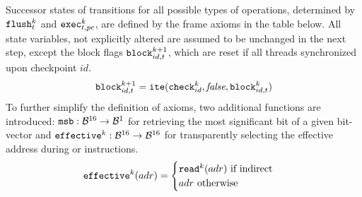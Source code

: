 \noindent
Successor states of transitions for all possible types of operations, determined by $\FLUSH^k_t$ and $\EXEC^k_{t, pc}$, are defined by the frame axioms in the table below.
All state variables, not explicitly altered are assumed to be unchanged in the next step, except the block flags $\BLOCK^{k + 1}_{id, t}$, which are reset if all threads synchronized upon checkpoint $id$.
\[
  \BLOCK^{k + 1}_{id, t} = \ITE(\CHECK^k_{id}, \FALSE, \BLOCK^k_{id, t})
\]
To further simplify the definition of axioms, two additional functions are introduced:
$\MSB: \BVSORT \to \BVSORT[1]$ for retrieving the most significant bit of a given bit-vector and $\EFFECTIVE^k: \BVSORT \to \BVSORT$ for transparently selecting the effective address during  or  instructions.
\[
  \EFFECTIVE^k(adr) =
  \begin{cases}
    \READ^k(adr) \text{ if indirect} \\
    adr \text{ otherwise}
  \end{cases}
\]




